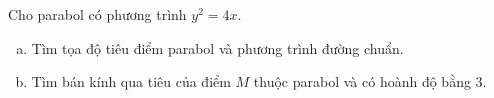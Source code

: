 \begin{vd}
	Cho parabol có phương trình $y^2=4x$.
	\begin{enumerate}[a)]
		\item Tìm tọa độ tiêu điểm parabol và phương trình đường chuẩn.
		\item Tìm bán kính qua tiêu của điểm $M$ thuộc parabol và có hoành độ bằng 3.
	\end{enumerate}
\end{vd}

